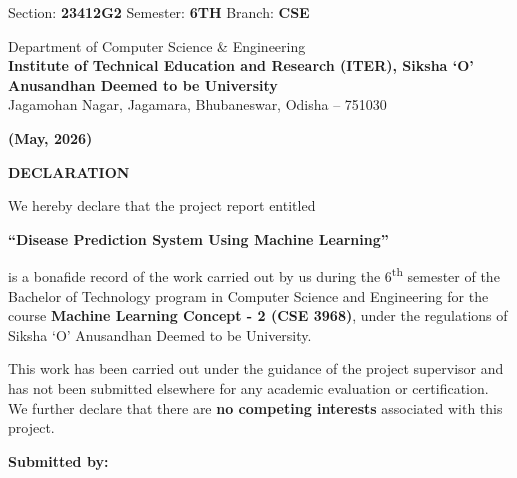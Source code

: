\documentclass[12pt,a4paper]{article}
\begin{document}
\begin{center}
\vspace{1cm}

Section: \textbf{23412G2} \hspace{0.8cm}
Semester: \textbf{6TH} \hspace{0.8cm}
Branch: \textbf{CSE}

\vspace{1.2cm}

{\small
Department of Computer Science \& Engineering\\
\textbf{Institute of Technical Education and Research (ITER), Siksha `O' Anusandhan Deemed to be University}\\
Jagamohan Nagar, Jagamara, Bhubaneswar, Odisha -- 751030
}

\vfill

\textbf{(May, 2026)}

\end{center}

\newpage

\begin{center}

{\Large \textbf{DECLARATION}}\\[1cm]

\end{center}

\noindent
We hereby declare that the project report entitled

\begin{center}
\textbf{``Disease Prediction System Using Machine Learning''}
\end{center}

\noindent
is a bonafide record of the work carried out by us during the 6\textsuperscript{th} semester of the Bachelor of Technology program in Computer Science and Engineering for the course \textbf{Machine Learning Concept - 2 (CSE 3968)}, under the regulations of Siksha `O' Anusandhan Deemed to be University.

\vspace{0.5cm}

\noindent
This work has been carried out under the guidance of the project supervisor and has not been submitted elsewhere for any academic evaluation or certification. We further declare that there are \textbf{no competing interests} associated with this project.

\vspace{1cm}

\noindent
\textbf{Submitted by:}
\end{document}
